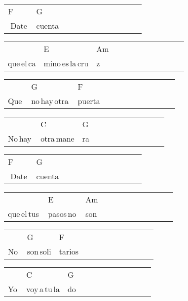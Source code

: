 \begin{multicols}{2}
\chorus{}

\noindent
\begin{minipage}{\columnwidth}
\noindent
\noindent
\begin{tabular}{llllllllllll}
F&G\\
\,\,Date\,&cuenta
\end{tabular}

\noindent
\begin{tabular}{llllllllllll}
&E&Am\\
que\,el\,ca&mino\,es\,la\,cru&z
\end{tabular}

\noindent
\begin{tabular}{llllllllllll}
&G&F\\
Que\,&no\,hay\,otra\,&puerta
\end{tabular}

\noindent
\begin{tabular}{llllllllllll}
&C&G\\
No\,hay\,&otra\,mane&ra
\end{tabular}

\noindent
\begin{tabular}{llllllllllll}
F&G\\
\,\,Date\,&cuenta
\end{tabular}

\noindent
\begin{tabular}{llllllllllll}
&E&Am\\
que\,el\,tus\,&pasos\,no\,&son
\end{tabular}

\noindent
\begin{tabular}{llllllllllll}
&G&F\\
No\,&son\,soli&tarios
\end{tabular}

\noindent
\begin{tabular}{llllllllllll}
&C&G\\
Yo\,&voy\,a\,tu\,la&do
\end{tabular}
\end{minipage}\\



\end{multicols}